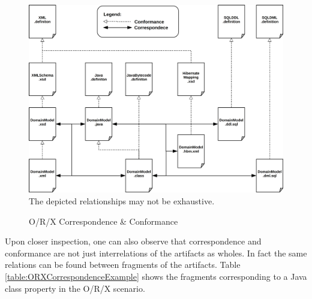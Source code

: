 \documentclass[runningheads,a4paper]{llncs}
\begin{document}
\begin{figure}[h!]
\centering
\includegraphics[width=.7\textwidth]{orx-correspondence-big-picture.png}
\\The depicted relationships may not be exhaustive.
\caption{O/R/X Correspondence \& Conformance}
\label{figure:ORXCorrespondenceBigPicture}
\end{figure}

Upon closer inspection, one can also observe that correspondence and conformance are not just interrelations of the artifacts as wholes.
In fact the same relations can be found between fragments of the artifacts.
Table \ref{table:ORXCorrespondenceExample} shows the fragments corresponding to a Java class property in the O/R/X scenario.

\begin{table}[h!]
\newline
\caption{O/R/X Fragment Correspondence}
\label{table:ORXCorrespondenceExample}
\end{table}
\end{document}
